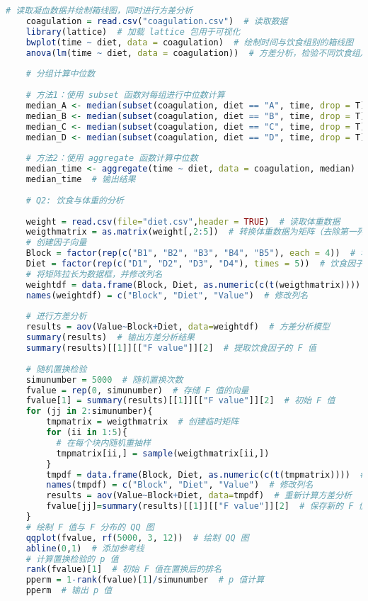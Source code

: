 \documentclass[UTF8]{report}
\theoremstyle{MyLineTheoremStyle} %
\theoremstyle{MyBlockTheoremStyle} %
\theoremstyle{MySubsubsectionStyle} %
\begin{document}
\begin{lstlisting}[language=R]
    # 读取凝血数据并绘制箱线图，同时进行方差分析
    coagulation = read.csv("coagulation.csv")  # 读取数据
    library(lattice)  # 加载 lattice 包用于可视化
    bwplot(time ~ diet, data = coagulation)  # 绘制时间与饮食组别的箱线图
    anova(lm(time ~ diet, data = coagulation))  # 方差分析，检验不同饮食组之间是否有显著差异
    
    # 分组计算中位数
    
    # 方法1：使用 subset 函数对每组进行中位数计算
    median_A <- median(subset(coagulation, diet == "A", time, drop = T))  # 饮食组 A 的中位数
    median_B <- median(subset(coagulation, diet == "B", time, drop = T))  # 饮食组 B 的中位数
    median_C <- median(subset(coagulation, diet == "C", time, drop = T))  # 饮食组 C 的中位数
    median_D <- median(subset(coagulation, diet == "D", time, drop = T))  # 饮食组 D 的中位数
    
    # 方法2：使用 aggregate 函数计算中位数
    median_time <- aggregate(time ~ diet, data = coagulation, median)  # 按组计算中位数
    median_time  # 输出结果
    
    # Q2: 饮食与体重的分析
    
    weight = read.csv(file="diet.csv",header = TRUE)  # 读取体重数据
    weigthmatrix = as.matrix(weight[,2:5])  # 转换体重数据为矩阵（去除第一列）
    # 创建因子向量
    Block = factor(rep(c("B1", "B2", "B3", "B4", "B5"), each = 4))  # 块因子
    Diet = factor(rep(c("D1", "D2", "D3", "D4"), times = 5))  # 饮食因子
    # 将矩阵拉长为数据框，并修改列名
    weightdf = data.frame(Block, Diet, as.numeric(c(t(weigthmatrix))))  # 转换为长格式数据框
    names(weightdf) = c("Block", "Diet", "Value")  # 修改列名
    
    # 进行方差分析
    results = aov(Value~Block+Diet, data=weightdf)  # 方差分析模型
    summary(results)  # 输出方差分析结果
    summary(results)[[1]][["F value"]][2]  # 提取饮食因子的 F 值
    
    # 随机置换检验
    simunumber = 5000  # 随机置换次数
    fvalue = rep(0, simunumber)  # 存储 F 值的向量
    fvalue[1] = summary(results)[[1]][["F value"]][2]  # 初始 F 值
    for (jj in 2:simunumber){
        tmpmatrix = weigthmatrix  # 创建临时矩阵
        for (ii in 1:5){
          # 在每个块内随机重抽样
          tmpmatrix[ii,] = sample(weigthmatrix[ii,])
        }
        tmpdf = data.frame(Block, Diet, as.numeric(c(t(tmpmatrix))))  # 转换为数据框
        names(tmpdf) = c("Block", "Diet", "Value")  # 修改列名
        results = aov(Value~Block+Diet, data=tmpdf)  # 重新计算方差分析
        fvalue[jj]=summary(results)[[1]][["F value"]][2]  # 保存新的 F 值
    }
    # 绘制 F 值与 F 分布的 QQ 图
    qqplot(fvalue, rf(5000, 3, 12))  # 绘制 QQ 图
    abline(0,1)  # 添加参考线
    # 计算置换检验的 p 值
    rank(fvalue)[1]  # 初始 F 值在置换后的排名
    pperm = 1-rank(fvalue)[1]/simunumber  # p 值计算
    pperm  # 输出 p 值
    

\end{lstlisting}
\end{document}
